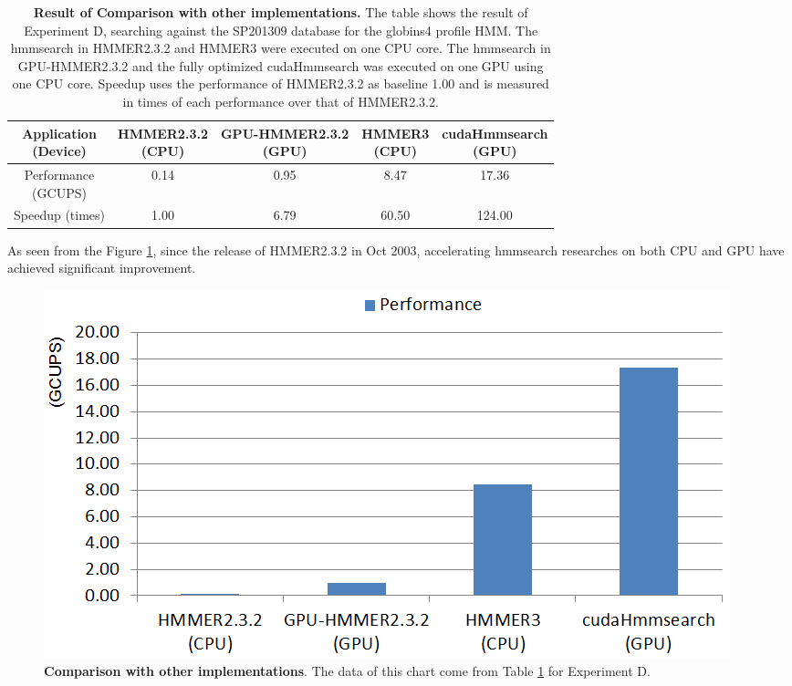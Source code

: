 \begin{table}[H]
\centering
\begin{tabular}{|c|c|c|c|c|}\hline
\shortstack{Application \\ (Device)} & \shortstack{HMMER2.3.2 \\ (CPU)} & \shortstack{GPU-HMMER2.3.2 \\ (GPU)} & \shortstack{HMMER3 \\ (CPU)} & \shortstack{cudaHmmsearch \\ (GPU)} \\\hline
\shortstack{Performance\\ (GCUPS)} & 0.14 & 0.95 & 8.47 & 17.36 \\\hline
Speedup (times) & 1.00 & 6.79 & 60.50 & 124.00 \\\hline
\end{tabular}
\caption{\selectfont \textbf{Result of Comparison with other implementations.} \label{tab.hmms} The table shows the result of Experiment D, searching against the SP201309 database for the globins4 profile HMM. The hmmsearch in HMMER2.3.2 and HMMER3 were executed on one CPU core. The hmmsearch in GPU-HMMER2.3.2 and the fully optimized cudaHmmsearch was executed on one GPU using one CPU core. Speedup uses the performance of HMMER2.3.2 as baseline 1.00 and is measured in times of each performance over that of HMMER2.3.2.}
\end{table}

As seen from the Figure \ref{fig:hmms}, since the release of HMMER2.3.2 in Oct 2003, accelerating hmmsearch researches on both CPU and GPU have achieved significant improvement.

\begin{figure}[!htb]
	\centering
	\includegraphics[totalheight=0.28\textheight]{Figures/manyhmms.png}
	\caption{\selectfont \textbf{Comparison with other implementations}. The data of this chart come from Table \ref{tab.hmms} for Experiment D.}
	\label{fig:hmms}
\end{figure}

